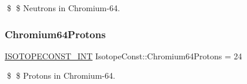 \$ \$ Neutrons in Chromium-\/64. \mbox{\label{group___isotope_const-_chromium-_cr64_ga9ae3f41312fd344dfcdd931dd83fb1aa}} 
\subsubsection{\texorpdfstring{Chromium64\+Protons}{Chromium64Protons}}
{\footnotesize\ttfamily \mbox{\hyperlink{group___isotope_const-_macros_ga5f18360b3e99483a35c32d789e62621c}{I\+S\+O\+T\+O\+P\+E\+C\+O\+N\+S\+T\+\_\+\+I\+NT}} Isotope\+Const\+::\+Chromium64\+Protons = 24}

\$ \$ Protons in Chromium-\/64. 